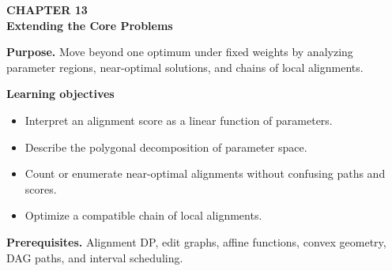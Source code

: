 \documentclass[11pt]{article}
\begin{document}
\begin{tcolorbox}[
  enhanced,breakable,colback=Primary!4,colframe=Primary,boxrule=0.9pt,
  arc=2mm,left=3mm,right=3mm,top=2.5mm,bottom=2.5mm]
{\sffamily\color{Accent}\bfseries CHAPTER 13}\\[-1pt]
{\sffamily\LARGE\bfseries\color{Primary} Extending the Core Problems}

\vspace{2pt}
\textbf{Purpose.} Move beyond one optimum under fixed weights by analyzing parameter regions, near-optimal solutions, and chains of local alignments.

\textbf{Learning objectives}
\begin{itemize}
  \item Interpret an alignment score as a linear function of parameters.
  \item Describe the polygonal decomposition of parameter space.
  \item Count or enumerate near-optimal alignments without confusing paths and scores.
  \item Optimize a compatible chain of local alignments.
\end{itemize}

\textbf{Prerequisites.} Alignment DP, edit graphs, affine functions, convex geometry, DAG paths, and interval scheduling.
\end{tcolorbox}
\end{document}
